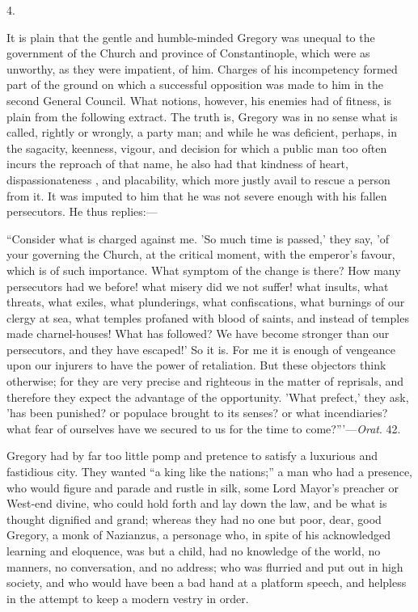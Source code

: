 4.

It is plain that the gentle and humble-minded Gregory was unequal
to the government of the Church and province of Constantinople, which
were as unworthy, as they were impatient, of him. Charges of his
incompetency formed part of the ground on which a successful
opposition was made to him in the second General Council. What
notions, however, his enemies had of fitness, is plain from the
following extract. The truth is, Gregory was in no sense what is
called, rightly or wrongly, a party man; and while he was deficient,
perhaps, in the sagacity, keenness, vigour, and decision for which a
public man too often incurs the reproach of that name, he also had
that kindness of heart, dispassionateness , and placability, which
more justly avail to rescue a person from it. It was imputed to him
that he was not severe enough with his fallen persecutors. He thus
replies:—

``Consider what is charged against me. 'So much time is
passed,' they say, 'of your governing the Church, at the critical
moment, with the emperor's favour, which is of such importance. What
symptom of the change is there? How many persecutors had we before!
what misery did we not suffer! what insults, what threats, what
exiles, what plunderings, what confiscations, what burnings of our
clergy at sea, what temples profaned with blood of saints, and instead
of temples made charnel-houses! What has followed? We have become
stronger than our persecutors, and they have escaped!' So it is. For
me it is enough of vengeance upon our injurers to have the power of
retaliation. But these objectors think otherwise; for they are very
precise and righteous in the matter of reprisals, and therefore they
expect the advantage of the opportunity. 'What prefect,' they ask,
'has been punished? or populace brought to its senses? or what
incendiaries? what fear of ourselves have we secured to us for the
time to come?'''—\emph{Orat}. 42.

Gregory had by far too little pomp and pretence to satisfy a
luxurious and fastidious city. They wanted ``a king like the
nations;'' a man who had a presence, who would figure and parade
and rustle in silk, some Lord Mayor's preacher or West-end divine, who
could hold forth and lay down the law, and be what is thought
dignified and grand; whereas they had no one but poor, dear, good
Gregory, a monk of Nazianzus, a personage who, in spite of his
acknowledged learning and eloquence, was but a child, had no knowledge
of the world, no manners, no conversation, and no address; who was
flurried and put out in high society, and who would have been a bad
hand at a platform speech, and helpless in the attempt to keep a
modern vestry in order.

